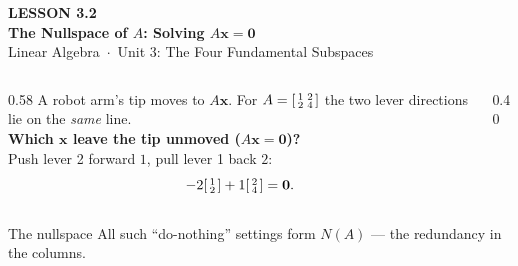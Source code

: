 \documentclass[aspectratio=169, 11pt]{beamer}
\newcommand{\xx}{\mathbf{x}}
\newcommand{\zero}{\mathbf{0}}
\begin{document}
{
\begin{frame}[plain]
  \vspace{2.8cm}\hspace{0.55cm}%
  \begin{minipage}{0.9\textwidth}
    {\color{goldacc}\bfseries\small LESSON 3.2}\\[0.5cm]
    {\color{white}\bfseries\LARGE The Nullspace of $A$: Solving $A\xx=\zero$}\\[1.0cm]
    {\color{blushmid}\small Linear Algebra~$\cdot$~Unit 3: The Four Fundamental Subspaces}
  \end{minipage}
\end{frame}
}

\begin{frame}[t, plain]
  \begin{columns}[T]
    \begin{column}{0.58\textwidth}
      A robot arm's tip moves to $A\xx$. For $A=\begin{bsmallmatrix} 1 & 2\\ 2 & 4 \end{bsmallmatrix}$ the
      two lever directions lie on the \emph{same} line.\\[8pt]
      \textbf{Which $\xx$ leave the tip unmoved ($A\xx=\zero$)?}\\[4pt]
      Push lever 2 forward $1$, pull lever 1 back $2$:
      \[ -2\begin{bsmallmatrix} 1\\2 \end{bsmallmatrix}+1\begin{bsmallmatrix} 2\\4 \end{bsmallmatrix}=\zero. \]
    \end{column}
    \begin{column}{0.40\textwidth}
      \centering
    \end{column}
  \end{columns}
  \vspace{2pt}
  \begin{block}{The nullspace}
    All such ``do-nothing'' settings form $N(A)$ --- the redundancy in the columns.
  \end{block}
\end{frame}
\end{document}
